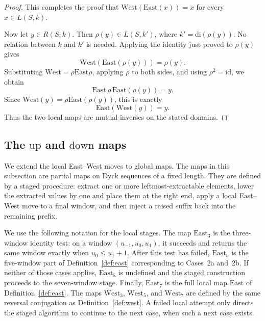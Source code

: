 \documentclass[11pt]{article}
\theoremstyle{plain}
\theoremstyle{definition}
\theoremstyle{remark}
\newcommand{\di}{\mathrm{di}}
\begin{document}
\begin{proof}
This completes the proof that \(\mathrm{West}(\mathrm{East}(x))=x\) for every
\(x\in L(S,k)\).

Now let \(y\in R(S,k)\). Then \(\rho(y)\in L(S,k')\), where
\(k'=\di(\rho(y))\). No relation between \(k\) and \(k'\) is needed. Applying
the identity just proved to \(\rho(y)\) gives
\[
  \mathrm{West}(\mathrm{East}(\rho(y)))=\rho(y).
\]
Substituting \(\mathrm{West}=\rho\mathrm{East}\rho\), applying \(\rho\) to both
sides, and using \(\rho^2=\mathrm{id}\), we obtain
\[
  \mathrm{East}\,\rho\,\mathrm{East}(\rho(y))=y.
\]
Since \(\mathrm{West}(y)=\rho\mathrm{East}(\rho(y))\), this is exactly
\[
  \mathrm{East}(\mathrm{West}(y))=y.
\]
Thus the two local maps are mutual inverses on the stated domains.
\end{proof}



\subsection{\texorpdfstring{The \(\mathrm{up}\) and \(\mathrm{down}\) maps}{The up and down maps}}
\label{subsec:up-down}

We extend the local East--West moves to global maps.  The maps in this subsection are
partial maps on Dyck sequences of a fixed length.  They are defined by a staged
procedure: extract one or more leftmost-extractable elements, lower the
extracted values by one and place them at the right end, apply a local
East--West move to a final window, and then inject a raised suffix back into the
remaining prefix.

We use the following notation for the local stages.  The map
\(\mathrm{East}_3\) is the three-window identity test: on a window
\((u_{-1},u_0,u_1)\), it succeeds and returns the same window exactly when
\(u_0\le u_1+1\).  After this test has failed,
\(\mathrm{East}_5\) is the five-window part of Definition~\ref{def:east}
corresponding to Cases~2a and~2b.  If neither of those cases applies,
\(\mathrm{East}_5\) is undefined and the staged construction proceeds to the
seven-window stage.  Finally, \(\mathrm{East}_7\) is the full local map
\(\mathrm{East}\) of Definition~\ref{def:east}.  The maps
\(\mathrm{West}_3\), \(\mathrm{West}_5\), and \(\mathrm{West}_7\) are defined
by the same reversal conjugation as Definition~\ref{def:west}.  A failed local
attempt only directs the staged algorithm to continue to the next case, when
such a next case exists.
\end{document}
